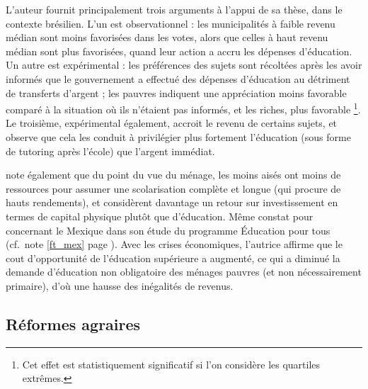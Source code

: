 \documentclass[pagesize, twoside=off, bibliography=totoc, DIV=calc, fontsize=12pt, a4paper, french]{scrartcl}
\begin{document}
L’auteur fournit principalement trois arguments à l’appui de sa thèse, dans le contexte brésilien. L’un est observationnel : les municipalités à faible revenu médian sont moins favorisées dans les votes, alors que celles à haut revenu médian sont plus favorisées, quand leur action a accru les dépenses d’éducation. Un autre est expérimental : les préférences des sujets sont récoltées après les avoir informés que le gouvernement a effectué des dépenses d’éducation au détriment de transferts d’argent ; les pauvres indiquent une appréciation moins favorable comparé à la situation où ils n’étaient pas informés, et les riches, plus favorable \footnote{Cet effet est statistiquement significatif si l’on considère les quartiles extrêmes.}. Le troisième, expérimental également, accroit le revenu de certains sujets, et observe que cela les conduit à privilégier plus fortement l’éducation (sous forme de tutoring après l’école) que l’argent immédiat.

 note également que du point du vue du ménage, les moins aisés ont moins de ressources pour assumer une scolarisation complète et longue (qui procure de hauts rendements), et considèrent davantage un retour sur investissement en termes de capital physique plutôt que d’éducation. Même constat pour \citet{urbina_intergenerational_2018} concernant le Mexique dans son étude du programme \og{}Éducation pour tous\fg{} (cf.\ note \ref{ft_mex} page \pageref{ft_mex}). Avec les crises économiques, l’autrice affirme que le cout d’opportunité de l’éducation supérieure a augmenté, ce qui a diminué la demande d’éducation non obligatoire des ménages pauvres (et non nécessairement primaire), d’où une hausse des inégalités de revenus.

\subsection{Réformes agraires}
\end{document}
